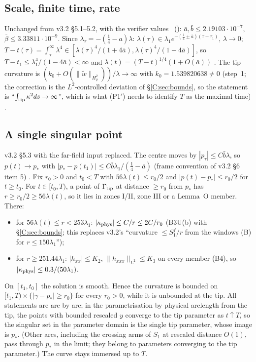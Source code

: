 \documentclass[11pt]{article}
\begin{document}
\subsection{Scale, finite time, rate}
Unchanged from v3.2 \S5.1--5.2, with the  verifier values \tC\ (\SV): $\bar a,\bar b\le2.19103\cdot10^{-7}$, $\bar\beta\le3.33811\cdot10^{-9}$. Since $\lambda_\tau=-(\frac14-a)\lambda$: $\lambda(\tau)\in\lambda_1e^{-(\frac14\pm\bar a)(\tau-\tau_1)}$, $\lambda\to0$; $T-t(\tau)=\int_\tau^\infty\lambda^4\in[\lambda(\tau)^4/(1+4\bar a),\lambda(\tau)^4/(1-4\bar a)]$, so $T-t_1\le\lambda_1^4/(1-4\bar a)<\infty$ and $\lambda(t)=(T-t)^{1/4}(1+O(\bar a))$ \tP. The tip curvature is $(k_0+O(\|\tilde w\|_{H^2_\rho}))/\lambda\to\infty$ with $k_0=1.539820638\ne0$ (step~1; the correction is the $L^2$-controlled deviation of \S\ref{C:sec:bounds}, so the statement is ``$\int_{\rm tip}\kappa^2ds\to\infty$'', which is what (P1$'$) needs to identify $T$ as the maximal time) \tP.

\subsection{A single singular point}\label{C:sec:point}
v3.2 \S5.3 with the far-field input replaced. The centre moves by $|p_\tau|\le C\bar b\lambda$, so $p(t)\to p_*$ with $|p_*-p(t_1)|\le C\bar b\lambda_1/(\frac14-\bar a)$ (frame convention of v3.2 \S6 item 5) \tP. Fix $r_0>0$ and $t_0<T$ with $56\lambda(t)\le r_0/2$ and $|p(t)-p_*|\le r_0/2$ for $t\ge t_0$. For $t\in[t_0,T)$, a point of $\Gamma_{\rm tip}$ at distance $\ge r_0$ from $p_*$ has $r\ge r_0/2\ge56\lambda(t)$, so it lies in zones I/II, zone III or a Lemma~O member. There:
\begin{itemize}[leftmargin=*]
\item for $56\lambda(t)\le r<253\lambda_1$: $|\kappa_{\rm phys}|\le C/r\le2C/r_0$ (B3U(b) with \S\ref{C:sec:bounds}; this replaces v3.2's ``curvature $\le S_1^f/r$ from the windows (B) for $r\le150\lambda_1$'');
\item for $r\ge251.44\lambda_1$: $|h_{xx}|\le K_2$, $\|h_{xxx}\|_{L^2}\le K_3$ on every member (B4), so $|\kappa_{\rm phys}|\le0.3/(50\lambda_1)$.
\end{itemize}
On $[t_1,t_0]$ the solution is smooth. Hence the curvature is bounded on $[t_1,T)\times\{|\gamma-p_*|\ge r_0\}$ for every $r_0>0$, while it is unbounded at the tip. All statements are arc by arc; in the parametrisation by physical arclength from the tip, the points with bounded rescaled $y$ converge to the tip parameter as $t\uparrow T$, so the singular set in the parameter domain is the single tip parameter, whose image is $p_*$. (Other arcs, including the crossing arms of $S_1$ at rescaled distance $O(1)$, pass through $p_*$ in the limit; they belong to parameters converging to the tip parameter.) The curve stays immersed up to $T$.
\end{document}
